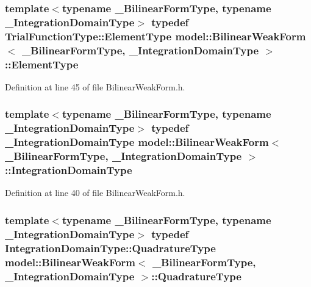 \subsubsection[{Element\+Type}]{\setlength{\rightskip}{0pt plus 5cm}template$<$typename \+\_\+\+Bilinear\+Form\+Type, typename \+\_\+\+Integration\+Domain\+Type$>$ typedef Trial\+Function\+Type\+::\+Element\+Type {\bf model\+::\+Bilinear\+Weak\+Form}$<$ \+\_\+\+Bilinear\+Form\+Type, \+\_\+\+Integration\+Domain\+Type $>$\+::{\bf Element\+Type}}\label{structmodel_1_1_bilinear_weak_form_a43a6e034f88493f8a1e5af511c16378b}


Definition at line 45 of file Bilinear\+Weak\+Form.\+h.

\hypertarget{structmodel_1_1_bilinear_weak_form_a537e7d0cf8fa78efb38cfe017e56196b}{}
\subsubsection[{Integration\+Domain\+Type}]{\setlength{\rightskip}{0pt plus 5cm}template$<$typename \+\_\+\+Bilinear\+Form\+Type, typename \+\_\+\+Integration\+Domain\+Type$>$ typedef \+\_\+\+Integration\+Domain\+Type {\bf model\+::\+Bilinear\+Weak\+Form}$<$ \+\_\+\+Bilinear\+Form\+Type, \+\_\+\+Integration\+Domain\+Type $>$\+::{\bf Integration\+Domain\+Type}}\label{structmodel_1_1_bilinear_weak_form_a537e7d0cf8fa78efb38cfe017e56196b}


Definition at line 40 of file Bilinear\+Weak\+Form.\+h.

\hypertarget{structmodel_1_1_bilinear_weak_form_a6d85c6150981888154a9939589f188d4}{}
\subsubsection[{Quadrature\+Type}]{\setlength{\rightskip}{0pt plus 5cm}template$<$typename \+\_\+\+Bilinear\+Form\+Type, typename \+\_\+\+Integration\+Domain\+Type$>$ typedef Integration\+Domain\+Type\+::\+Quadrature\+Type {\bf model\+::\+Bilinear\+Weak\+Form}$<$ \+\_\+\+Bilinear\+Form\+Type, \+\_\+\+Integration\+Domain\+Type $>$\+::{\bf Quadrature\+Type}}\label{structmodel_1_1_bilinear_weak_form_a6d85c6150981888154a9939589f188d4}


